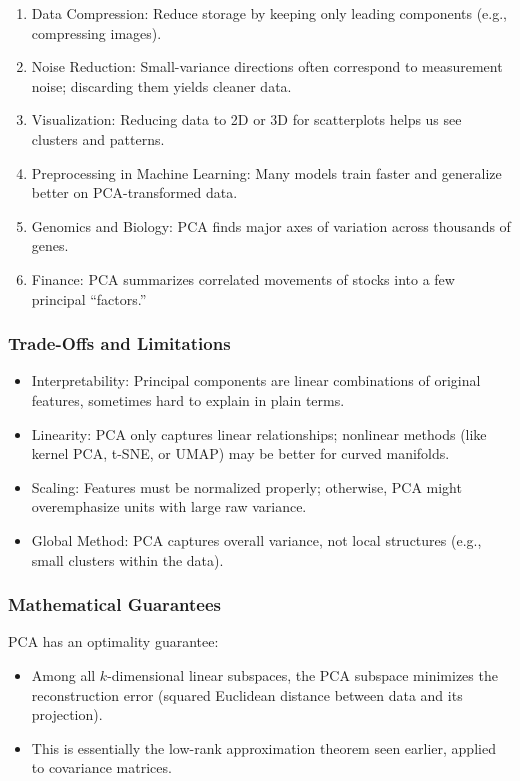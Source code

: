 \documentclass[
  letterpaper,
  DIV=11,
  numbers=noendperiod]{scrreprt}
\providecommand{\tightlist}{%
  \setlength{\itemsep}{0pt}\setlength{\parskip}{0pt}}
\begin{document}
\begin{enumerate}
\def\labelenumi{\arabic{enumi}.}
\tightlist
\item
  Data Compression: Reduce storage by keeping only leading components
  (e.g., compressing images).
\item
  Noise Reduction: Small-variance directions often correspond to
  measurement noise; discarding them yields cleaner data.
\item
  Visualization: Reducing data to 2D or 3D for scatterplots helps us see
  clusters and patterns.
\item
  Preprocessing in Machine Learning: Many models train faster and
  generalize better on PCA-transformed data.
\item
  Genomics and Biology: PCA finds major axes of variation across
  thousands of genes.
\item
  Finance: PCA summarizes correlated movements of stocks into a few
  principal ``factors.''
\end{enumerate}

\subsubsection{Trade-Offs and
Limitations}\label{trade-offs-and-limitations}

\begin{itemize}
\tightlist
\item
  Interpretability: Principal components are linear combinations of
  original features, sometimes hard to explain in plain terms.
\item
  Linearity: PCA only captures linear relationships; nonlinear methods
  (like kernel PCA, t-SNE, or UMAP) may be better for curved manifolds.
\item
  Scaling: Features must be normalized properly; otherwise, PCA might
  overemphasize units with large raw variance.
\item
  Global Method: PCA captures overall variance, not local structures
  (e.g., small clusters within the data).
\end{itemize}

\subsubsection{Mathematical Guarantees}\label{mathematical-guarantees}

PCA has an optimality guarantee:

\begin{itemize}
\tightlist
\item
  Among all \(k\)-dimensional linear subspaces, the PCA subspace
  minimizes the reconstruction error (squared Euclidean distance between
  data and its projection).
\item
  This is essentially the low-rank approximation theorem seen earlier,
  applied to covariance matrices.
\end{itemize}
\end{document}
